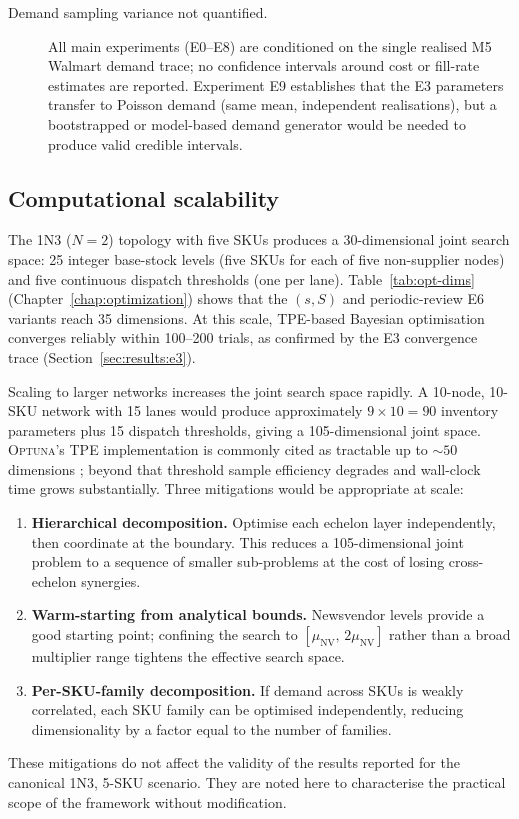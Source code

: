 \begin{description}
  \item[Demand sampling variance not quantified.] All main experiments
        (E0--E8) are conditioned on the single realised M5 Walmart
        demand trace; no confidence intervals around cost or fill-rate
        estimates are reported.  Experiment E9 establishes that the
        E3 parameters transfer to Poisson demand (same mean, independent
        realisations), but a bootstrapped or model-based demand
        generator would be needed to produce valid credible intervals.
\end{description}

\subsection{Computational scalability}
\label{sec:disc:scalability}

The 1N3 ($N=2$) topology with five SKUs produces a 30-dimensional
joint search space: 25 integer base-stock levels (five SKUs for each
of five non-supplier nodes) and five continuous dispatch thresholds
(one per lane).  Table~\ref{tab:opt-dims} (Chapter~\ref{chap:optimization})
shows that the $(s,S)$ and periodic-review E6 variants reach 35
dimensions.  At this scale, TPE-based Bayesian optimisation converges
reliably within 100--200 trials, as confirmed by the E3 convergence
trace (Section~\ref{sec:results:e3}).

Scaling to larger networks increases the joint search space rapidly.
A 10-node, 10-SKU network with 15 lanes would produce
approximately $9 \times 10 = 90$ inventory parameters plus
15 dispatch thresholds, giving a 105-dimensional joint space.
\textsc{Optuna}'s TPE implementation is commonly cited as tractable
up to $\sim\!50$ dimensions \citep{AkibaEtAl2019}; beyond that
threshold sample efficiency degrades and wall-clock time grows
substantially.  Three mitigations would be appropriate at scale:
\begin{enumerate}
  \item \textbf{Hierarchical decomposition.}  Optimise each echelon
        layer independently, then coordinate at the boundary.
        This reduces a 105-dimensional joint problem to a sequence of
        smaller sub-problems at the cost of losing cross-echelon
        synergies.
  \item \textbf{Warm-starting from analytical bounds.}  Newsvendor
        levels provide a good starting point; confining the search to
        $[\mu_{\text{NV}},\, 2 \mu_{\text{NV}}]$ rather than a broad
        multiplier range tightens the effective search space.
  \item \textbf{Per-SKU-family decomposition.}  If demand across SKUs
        is weakly correlated, each SKU family can be optimised
        independently, reducing dimensionality by a factor equal to
        the number of families.
\end{enumerate}
These mitigations do not affect the validity of the results reported
for the canonical 1N3, 5-SKU scenario.  They are noted here to
characterise the practical scope of the framework without modification.
